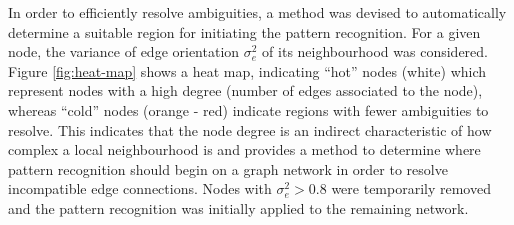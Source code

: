 In order to efficiently resolve ambiguities, a method was devised to automatically determine a suitable region for initiating the pattern recognition. For a given node, the variance of edge orientation $\sigma_e^2$ of its neighbourhood was considered. Figure \ref{fig:heat-map} shows a heat map, indicating ``hot'' nodes (white) which represent nodes with a high degree (number of edges associated to the node), whereas ``cold'' nodes (orange - red) indicate regions with fewer ambiguities to resolve. This indicates that the node degree is an indirect characteristic of how complex a local neighbourhood is and provides a method to determine where pattern recognition should begin on a graph network in order to resolve incompatible edge connections. Nodes with $\sigma_e^2 > 0.8$ were temporarily removed and the pattern recognition was initially applied to the remaining network.

